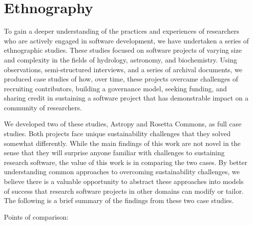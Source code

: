 \documentclass[
]{book}
\begin{document}
\hypertarget{ethnography}{%
\section{Ethnography}\label{ethnography}}

To gain a deeper understanding of the practices and experiences of researchers
who are actively engaged in software development, we have undertaken a series of
ethnographic studies. These studies focused on software projects of varying
size and complexity in the fields of hydrology, astronomy, and biochemistry.
Using observations, semi-structured interviews, and a
series of archival documents, we produced case studies of how, over time, these
projects overcame challenges of recruiting contributors, building a governance
model, seeking funding, and sharing credit in sustaining a software project that
has demonstrable impact on a community of researchers.

We developed two of these studies, Astropy and Rosetta Commons, as full case
studies. Both projects face unique sustainability challenges that they solved
somewhat differently. While the main findings of this work are not novel
in the sense that they will surprise anyone familiar with challenges to sustaining
research software, the value of this work is in comparing the two cases. By better
understanding common approaches to overcoming sustainability challenges, we believe
there is a valuable opportunity to abstract these approaches into models of success
that research software projects in other domains can modify or tailor.
The following is a brief summary of the findings from these two case studies.

Points of comparison:
\end{document}
